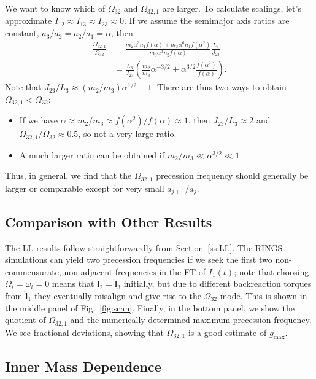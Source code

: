 \documentclass[11pt,
        usenames, %
        dvipsnames %
    ]{article}
\newcommand*{\bm}[1]{\boldsymbol{\mathbf{#1}}}
\newcommand*{\uv}[1]{\hat{\bm{#1}}}
\newcommand*{\p}[1]{\left(#1\right)}
\begin{document}
We want to know which of $\Omega_{32}$ and $\Omega_{32, 1}$ are larger. To
calculate scalings, let's approximate $I_{12} \approx I_{13} \approx I_{23}
\approx 0$. If we assume the semimajor axis ratios are constant, $a_3 / a_2 =
a_2 / a_1 = \alpha$, then
\begin{align}
    \frac{\Omega_{32, 1}}{\Omega_{32}}
        &= \frac{m_2 \alpha^3 n_1 f(\alpha)
            + m_3 \alpha^6 n_1 f(\alpha^2)}{m_3 \alpha^3 n_2
            f(\alpha)}\frac{L_3}{J_{23}}\nonumber\\
        &= \frac{L_3}{J_{23}}\p{
            \frac{m_2}{m_3}\alpha^{-3/2}
                + \alpha^{3/2}\frac{f\p{\alpha^2}}{f(\alpha)}}.
\end{align}
Note that $J_{23} / L_3 \approx (m_2/m_3)\alpha^{1/2} + 1$. There are thus two
ways to obtain $\Omega_{32, 1} < \Omega_{32}$:
\begin{itemize}
    \item If we have $\alpha \approx m_2/m_3 \approx f\p{\alpha^2} / f(\alpha)
        \approx 1$, then $J_{23} / L_3 \approx 2$ and $\Omega_{32, 1} /
        \Omega_{32} \approx 0.5$, so not a very large ratio.

    \item A much larger ratio can be obtained if $m_2/m_3 \ll \alpha^{3/2} \ll
        1$.
\end{itemize}
Thus, in general, we find that the $\Omega_{32, 1}$ precession frequency should
generally be larger or comparable except for very small $a_{j + 1} / a_j$.

\subsection{Comparison with Other Results}

The LL results follow straightforwardly from Section~\ref{ss:LL}. The RINGS
simulations can yield two precession frequencies if we seek the first two
non-commensurate, non-adjacent frequencies in the FT of $I_1(t)$; note that
choosing $\Omega_{i} = \omega_i = 0$ means that $\uv{l}_2 = \uv{l}_3$ initially,
but due to different backreaction torques from $\uv{l}_1$ they eventually
misalign and give rise to the $\Omega_{32}$ mode. This is shown in the middle
panel of Fig.~\ref{fig:scan}. Finally, in the bottom panel, we show the quotient
of $\Omega_{32, 1}$ and the numerically-determined maximum precession frequency.
We see fractional deviations, showing that $\Omega_{32, 1}$ is a good estimate
of $g_{\max}$.

\subsection{Inner Mass Dependence}
\end{document}
